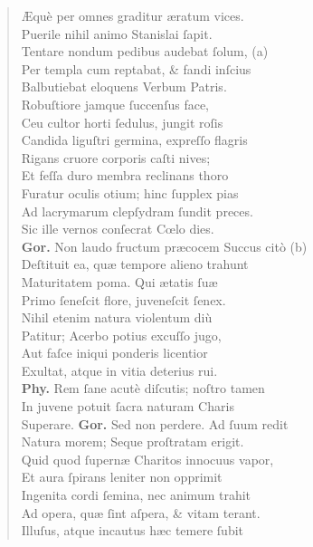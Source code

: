 \documentclass[a4paper,12pt]{article}
\begin{document}
\begin{verse}
Æquè per omnes graditur æratum vices.\\[0pt]
Puerile nihil animo Stanislai ſapit.\\[0pt]
Tentare nondum pedibus audebat ſolum, (a)\footnotemark\\[0pt]
Per templa cum reptabat, \& fandi inſcius\\[0pt]
Balbutiebat eloquens Verbum Patris.\\[0pt]
Robuſtiore jamque ſuccenſus face,\\[0pt]
Ceu cultor horti ſedulus, jungit roſis\\[0pt]
Candida liguſtri germina, expreſſo flagris\\[0pt]
Rigans cruore corporis caſti nives;\\[0pt]
Et feſſa duro membra reclinans thoro\\[0pt]
Furatur oculis otium; hinc ſupplex pias\\[0pt]
Ad lacrymarum clepſydram ſundit preces.\\[0pt]
Sic ille vernos conſecrat Cœlo dies.\\[0pt]
\textbf{Gor.} Non laudo fructum præcocem Succus citò (b)\footnotemark\\[0pt]
Deſtituit ea, quæ tempore alieno trahunt\\[0pt]
Maturitatem poma. Qui ætatis ſuæ\\[0pt]
Primo ſeneſcit flore, juveneſcit ſenex.\\[0pt]
Nihil etenim natura violentum diù\\[0pt]
Patitur; Acerbo potius excuſſo jugo,\\[0pt]
Aut faſce iniqui ponderis licentior\\[0pt]
Exultat, atque in vitia deterius rui.\\[0pt]
\textbf{Phy.} Rem ſane acutè diſcutis; noſtro tamen\\[0pt]
In juvene potuit ſacra naturam Charis\\[0pt]
Superare. \textbf{Gor.} Sed non perdere. Ad ſuum redit\\[0pt]
Natura morem; Seque proſtratam erigit.\\[0pt]
Quid quod ſupernæ Charitos innocuus vapor,\\[0pt]
Et aura ſpirans leniter non opprimit\\[0pt]
Ingenita cordi ſemina, nec animum trahit\\[0pt]
Ad opera, quæ ſint aſpera, \& vitam terant.\\[0pt]
Illuſus, atque incautus hæc temere ſubit\\[0pt]

\end{verse}
\end{document}
